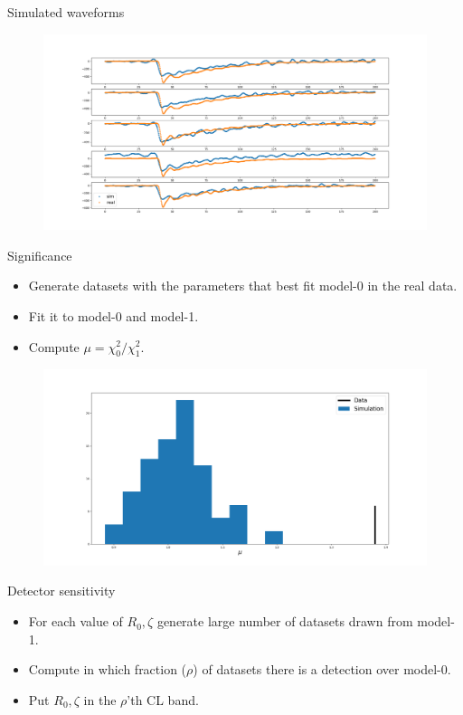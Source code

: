 \documentclass{beamer}
\begin{document}
\begin{frame}{Simulated waveforms}
\begin{figure}[h]
  \includegraphics[width=\linewidth]{simWFs.png}
\end{figure}
\end{frame}

\begin{frame}{Significance}
\begin{itemize}
\item Generate datasets with the parameters that best fit model-0 in the real data.
\item Fit it to model-0 and model-1.
\item Compute $\mu=\chi^2_0/\chi^2_1$.
\end{itemize}
\begin{figure}[h]
  \includegraphics[width=\linewidth]{sag.png}
\end{figure}
\end{frame}

\begin{frame}{Detector sensitivity}
\begin{itemize}
\item For each value of $R_0, \zeta$ generate large number of datasets drawn from model-1.
\item Compute in which fraction ($\rho$) of datasets there is a detection over model-0.
\item Put $R_0, \zeta$ in  the $\rho$'th CL band.
\end{itemize}
\end{frame}
\end{document}
